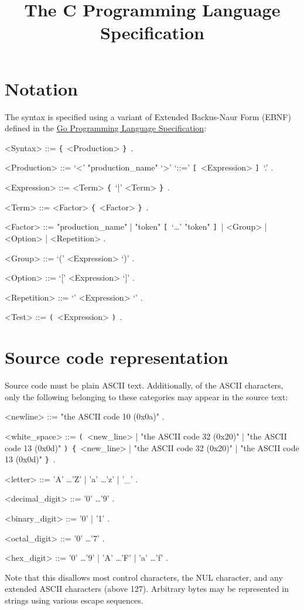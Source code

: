 \documentclass{article}
\title{The C Programming Language Specification}
\def\lrep{\synshortsoff\texttt{\{}\synshorts~}
\def\rrep{\synshortsoff\texttt{\}}\synshorts~}
\def\lopt{\synshortsoff\texttt{[}\synshorts~}
\def\ropt{\synshortsoff\texttt{]}\synshorts~}
\def\lgrp{\synshortsoff\texttt{(}\synshorts~}
\def\rgrp{\synshortsoff\texttt{)}\synshorts~}
\begin{document}
\maketitle

\section*{Notation}
The syntax is specified using a variant of Extended Backus-Naur Form (EBNF) defined in the \href{https://go.dev/ref/spec#Notation}{Go Programming Language Specification}:
\begin{grammar}
  <Syntax> ::= \lrep <Production> \rrep .
  
  <Production> ::= `<' "production_name" `>' `::=' \lopt <Expression> \ropt `.' .
  
  <Expression> ::= <Term> \lrep `|' <Term> \rrep .
  
  <Term> ::= <Factor> \lrep <Factor> \rrep .
  
  <Factor> ::= "production_name" | "token" \lopt `\ldots' "token" \ropt | <Group> | <Option> | <Repetition> .
  
  <Group> ::= `(' <Expression> `)' .
  
  <Option> ::= `[' <Expression> `]' .
  
  <Repetition> ::= `{' <Expression> `}' .

  <Test> ::= \lgrp <Expression> \rgrp .
  
\end{grammar}
\section*{Source code representation}
Source code must be plain ASCII text. Additionally, of the ASCII
characters, only the following belonging to these categories may
appear in the source text:
\begin{grammar}
  <newline> ::= "the ASCII code 10 (0x0a)" .

  <white_space> ::= \lgrp <new_line> | "the ASCII code 32 (0x20)" | "the ASCII code 13 (0x0d)" \rgrp \lrep <new_line> | "the ASCII code 32 (0x20)" | "the ASCII code 13 (0x0d)" \rrep .

  <letter> ::= 'A' \ldots 'Z' | 'a' \ldots 'z' | '_' .

  <decimal_digit> ::= '0' \ldots '9' .

  <binary_digit> ::= '0' | '1' .

  <octal_digit> ::= '0' \ldots '7' .

  <hex_digit> ::= '0' \ldots '9' | 'A' \ldots 'F' | 'a' \ldots 'f' .
  
\end{grammar}
Note that this disallows most control characters, the NUL character,
and any extended ASCII characters (above 127). Arbitrary bytes may be
represented in strings using various escape sequences. %
\end{document}
